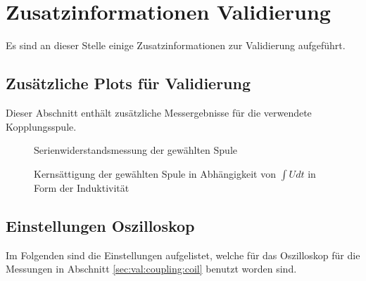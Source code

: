 \chapter{Zusatzinformationen Validierung}
\label{app:validation}

Es  sind   an  dieser   Stelle  einige  Zusatzinformationen   zur  Validierung
aufgef\"uhrt.

\clearpage
\section{Zus\"atzliche Plots f\"ur Validierung}

Dieser Abschnitt enth\"alt zus\"atzliche Messergebnisse f\"ur die verwendete
Kopplungsspule.

\begin{figure}[h!tb]
    \centering
    
    \caption[Messresultate Kopplungsspule: Serienwiderstand Spule]{Serienwiderstandsmessung der gew\"ahlten Spule}
    \label{fig:meas:coupling:coil:R}
\end{figure}

\begin{figure}[h!tb]
    \centering
    
    \caption[Messresultate Kopplungsspule: Kerns\"attigung \"uber Fluss]{Kerns\"attigung der gew\"ahlten Spule in Abh\"angigkeit von $\int U dt$ in Form der Induktivit\"at}
    \label{fig:meas:coupling:coil:power_choke:2}
\end{figure}


\clearpage
\section{Einstellungen Oszilloskop}
\label{app:scope:settings}

Im Folgenden sind die Einstellungen  aufgelistet, welche f\"ur das Oszilloskop
f\"ur die  Messungen in  Abschnitt \ref{sec:val:coupling:coil}  benutzt worden
sind.

